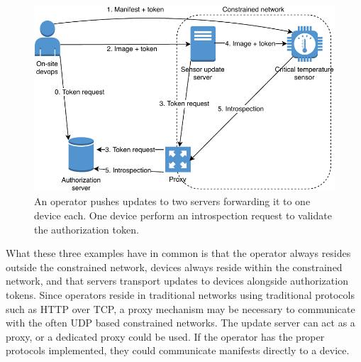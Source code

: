 \documentclass[0-thesis.tex]{subfiles}
\begin{document}
\begin{figure}
    \caption{An operator pushes updates to two servers forwarding it to one device each. 
                One device perform an introspection request to validate the authorization 
                token.}
    \label{fig:industry}
    \includegraphics{images/use-case-industry.pdf}
\end{figure}

What these three examples have in common is that the operator always resides outside the
constrained network, devices always reside within the constrained network, and that
servers transport updates to devices alongside authorization tokens. Since operators
reside in traditional networks using traditional protocols such as HTTP over TCP, a proxy
mechanism may be necessary to communicate with the often UDP based constrained networks.
The update server can act as a proxy, or a dedicated proxy could be used. If the operator
has the proper protocols implemented, they could communicate manifests directly to a
device.
\end{document}
